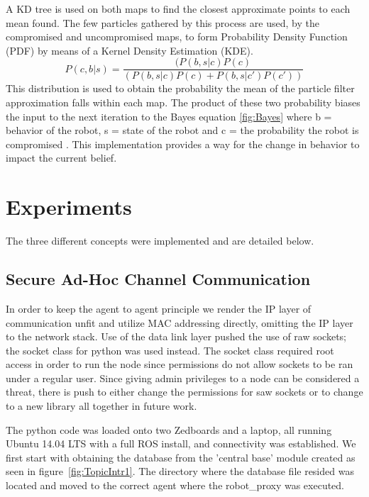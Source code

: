 \documentclass[conference]{IEEEtran}
\begin{document}
A KD tree is used on both maps to find the closest approximate points to each mean found. The few particles gathered by this process are used, by the compromised and uncompromised maps, to form Probability Density Function (PDF) by means of a Kernel Density Estimation (KDE). 
\begin{equation}
 P(c,b|s) =\frac {(P(b,s|c)P(c)} {(P(b,s|c)P(c) + 
 P(b,s|c' )P(c' ))} 
 \label{fig:Bayes}
\end{equation}
This distribution is used to obtain the probability the mean of the particle filter approximation falls within each map. The product of these two probability biases the input to the next iteration to the Bayes equation \autoref{fig:Bayes} where b = behavior of the robot, s = state of the robot and c = the probability the robot is compromised \cite{Thrun2002Probabilistic}. This implementation provides a way for the change in behavior to impact the current belief.


\section{Experiments} \label{Experiments}

The three different concepts were implemented and are detailed below.

\subsection{Secure Ad-Hoc Channel Communication}

In order to keep the agent to agent principle we render the IP layer of communication unfit and utilize MAC addressing directly, omitting the IP layer to the network stack. Use of the data link layer pushed the use of raw sockets; the socket class for python was used instead. The socket class required root access in order to run the node since permissions do not allow sockets to be ran under a regular user. Since giving admin privileges to a node can be considered a threat, there is push to either change the permissions for saw sockets or to change to a new library all together in future work.

The python code was loaded onto two Zedboards and a laptop, all running Ubuntu 14.04 LTS with a full ROS install, and connectivity was established. We first start with obtaining the database from the 'central base' module created as seen in figure~\autoref{fig:TopicIntr1}. The directory where the database file resided was located and moved to the correct agent where the robot\_proxy was executed.
\end{document}
